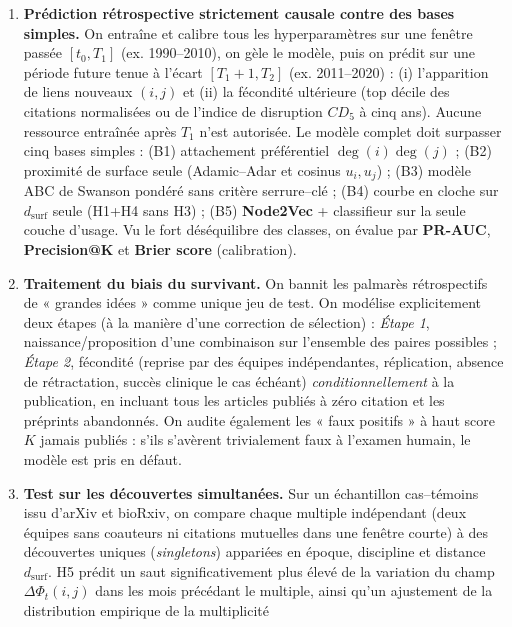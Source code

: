 \documentclass[a4paper,11pt]{article}
\providecommand{\tightlist}{\setlength{\itemsep}{0pt}\setlength{\parskip}{0pt}}
\begin{document}
\begin{enumerate}
\def\labelenumi{\arabic{enumi}.}
\tightlist
\item
  \textbf{Prédiction rétrospective strictement causale contre des bases
  simples.} On entraîne et calibre tous les hyperparamètres sur une
  fenêtre passée \([t_0, T_1]\) (ex. 1990--2010), on gèle le modèle,
  puis on prédit sur une période future tenue à l'écart \([T_1+1, T_2]\)
  (ex. 2011--2020) : (i) l'apparition de liens nouveaux \((i,j)\) et
  (ii) la fécondité ultérieure (top décile des citations normalisées ou
  de l'indice de disruption \(CD_5\) à cinq ans). Aucune ressource
  entraînée après \(T_1\) n'est autorisée. Le modèle complet doit
  surpasser cinq bases simples : (B1) attachement préférentiel
  \(\deg(i)\deg(j)\) ; (B2) proximité de surface seule (Adamic--Adar et
  cosinus \(u_i, u_j\)) ; (B3) modèle ABC de Swanson pondéré sans
  critère serrure--clé ; (B4) courbe en cloche sur \(d_{\mathrm{surf}}\)
  seule (H1+H4 sans H3) ; (B5) \textbf{Node2Vec} + classifieur sur la
  seule couche d'usage. Vu le fort déséquilibre des classes, on évalue
  par \textbf{PR-AUC}, \textbf{Precision@K} et \textbf{Brier score}
  (calibration).
\item
  \textbf{Traitement du biais du survivant.} On bannit les palmarès
  rétrospectifs de « grandes idées » comme unique jeu de test. On
  modélise explicitement deux étapes (à la manière d'une correction de
  sélection) : \emph{Étape 1}, naissance/proposition d'une combinaison
  sur l'ensemble des paires possibles ; \emph{Étape 2}, fécondité
  (reprise par des équipes indépendantes, réplication, absence de
  rétractation, succès clinique le cas échéant)
  \emph{conditionnellement} à la publication, en incluant tous les
  articles publiés à zéro citation et les préprints abandonnés. On
  audite également les « faux positifs » à haut score \(K\) jamais
  publiés : s'ils s'avèrent trivialement faux à l'examen humain, le
  modèle est pris en défaut.
\item
  \textbf{Test sur les découvertes simultanées.} Sur un échantillon
  cas--témoins issu d'arXiv et bioRxiv, on compare chaque multiple
  indépendant (deux équipes sans coauteurs ni citations mutuelles dans
  une fenêtre courte) à des découvertes uniques (\emph{singletons})
  appariées en époque, discipline et distance \(d_{\mathrm{surf}}\). H5
  prédit un saut significativement plus élevé de la variation du champ
  \(\Delta \Phi_t(i,j)\) dans les mois précédant le multiple, ainsi
  qu'un ajustement de la distribution empirique de la multiplicité

\end{enumerate}
\end{document}
